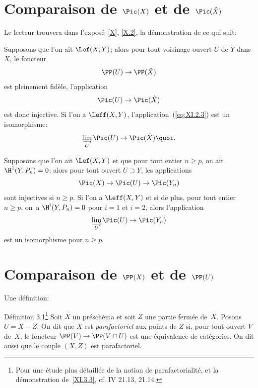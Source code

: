 \section{Comparaison de $\Pic(X)$ et de $\Pic(\hat X)$} \label{XI.2}

Le lecteur trouvera dans l'expos\'e~\ref{X}, \numero \ref{X.2}, la d\'emonstration de ce qui suit:

\begin{proposition} \label{XI.2.1} Supposons que l'on ait $\Lef(X, Y)$; alors pour tout voisinage ouvert $U$ de $Y$ dans $X$, le foncteur
\begin{equation} \label{eq:XI.2.1} \PP(U)\to\PP(\hat X)
\end{equation}
est pleinement fid\`ele, l'application
\begin{equation} \label{eq:XI.2.2} \Pic(U)\to\Pic(\hat X)
\end{equation}
est donc injective. Si l'on a $\Leff(X, Y)$, l'application~(\ref{eq:XI.2.3}) est un isomorphisme:
\begin{equation} \label{eq:XI.2.3}
\varinjlim_U\Pic(U)\to\Pic(\hat X){\quoi}.
\end{equation}
\end{proposition}

\begin{corollaire} \label{XI.2.2} Supposons que l'on ait $\Lef(X, Y)$ et que pour tout entier $n\geq p$, on ait $\H^1(Y, P_n)=0$; alors pour tout ouvert $U\supset Y$, les applications
\[
\Pic(X)\to\Pic(U)\to\Pic(Y_n)
\]
sont injectives si $n\geq p$. Si l'on a $\Leff(X, Y)$ et si de plus, pour tout entier $n\geq p$, on~a $\H^i(Y, P_n)=0$ pour $i=1$ et $i=2$, alors l'application
\[
\varinjlim_U\Pic(U)\to\Pic(Y_n)
\]
est un isomorphisme pour $n\geq p$.
\end{corollaire}

\section{Comparaison de $\PP(X)$ et de $\PP(U)$} \label{XI.3}

Une d\'efinition:
\label{XI.3.1}
\begin{enonce*}[remark]{D\'efinition 3.1\footnote{Pour une \'etude plus d\'etaill\'ee de la notion de parafactorialit\'e, et la d\'emonstration de~\ref{XI.3.3}, cf. \EGA IV 21.13, 21.14.}}
Soit $X$ un pr\'esch\'ema et soit $Z$ une partie ferm\'ee de~$X$. Posons $U=X-Z$. On dit que $X$ est \emph{parafactoriel} aux points de $Z$ si, pour tout ouvert $V$ de~$X$, le foncteur $\PP(V)\to \PP(V\cap U)$ est une \'equivalence de cat\'egories. On dit aussi que le couple $(X, Z)$ est parafactoriel.
\end{enonce*}


